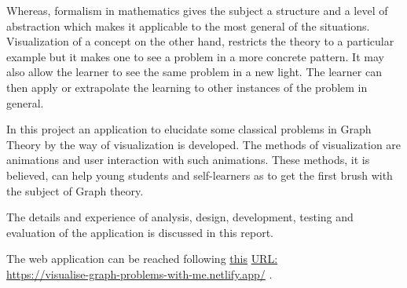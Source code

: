 Whereas, formalism in mathematics gives the subject a structure and a level of
abstraction which makes it applicable to the most general of the situations.
Visualization of a concept on the other hand, restricts the theory to a
particular example but it makes one to see a problem in a more concrete
pattern. It may also allow the learner to see the same problem in a new light. The
learner can then apply or extrapolate the learning to other instances of the problem in
general. 

In this project an application to elucidate some classical problems in Graph
Theory by the way of visualization is developed. The methods of visualization
are animations and user interaction with such animations. These methods, it is
believed, can help young students and self-learners as to get the first brush
with the subject of Graph theory.

The details and experience of analysis, design, development, testing and
evaluation of the application is discussed in this report.

The web application can be reached following
\href{https://visualise-graph-problems-with-me.netlify.app/} {this} 
\href{https://visualise-graph-problems-with-me.netlify.app/} {URL:} \\
\href{https://visualise-graph-problems-with-me.netlify.app/} {https://visualise-graph-problems-with-me.netlify.app/}
.
